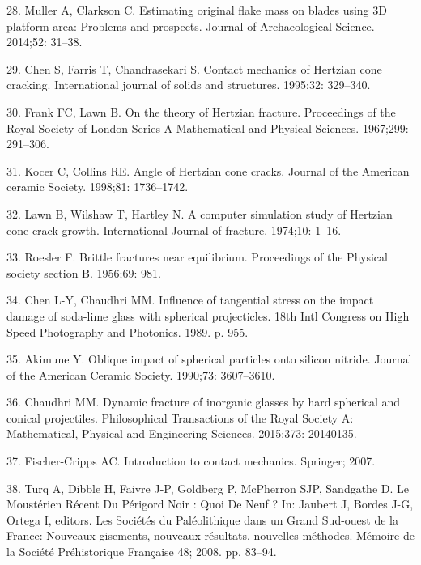 \documentclass[10pt,letterpaper]{article}
\begin{document}
\leavevmode\hypertarget{ref-muller_estimating_2014}{}%
28. Muller A, Clarkson C. Estimating original flake mass on blades using
3D platform area: Problems and prospects. Journal of Archaeological
Science. 2014;52: 31--38.

\leavevmode\hypertarget{ref-chen_contact_1995}{}%
29. Chen S, Farris T, Chandrasekari S. Contact mechanics of Hertzian
cone cracking. International journal of solids and structures. 1995;32:
329--340.

\leavevmode\hypertarget{ref-frank_theory_1967}{}%
30. Frank FC, Lawn B. On the theory of Hertzian fracture. Proceedings of
the Royal Society of London Series A Mathematical and Physical Sciences.
1967;299: 291--306.

\leavevmode\hypertarget{ref-kocer_angle_1998}{}%
31. Kocer C, Collins RE. Angle of Hertzian cone cracks. Journal of the
American ceramic Society. 1998;81: 1736--1742.

\leavevmode\hypertarget{ref-lawn_computer_1974}{}%
32. Lawn B, Wilshaw T, Hartley N. A computer simulation study of
Hertzian cone crack growth. International Journal of fracture. 1974;10:
1--16.

\leavevmode\hypertarget{ref-roesler_brittle_1956}{}%
33. Roesler F. Brittle fractures near equilibrium. Proceedings of the
Physical society section B. 1956;69: 981.

\leavevmode\hypertarget{ref-chen_influence_1989}{}%
34. Chen L-Y, Chaudhri MM. Influence of tangential stress on the impact
damage of soda-lime glass with spherical projecticles. 18th Intl
Congress on High Speed Photography and Photonics. 1989. p. 955.

\leavevmode\hypertarget{ref-akimune_oblique_1990}{}%
35. Akimune Y. Oblique impact of spherical particles onto silicon
nitride. Journal of the American Ceramic Society. 1990;73: 3607--3610.

\leavevmode\hypertarget{ref-chaudhri_dynamic_2015}{}%
36. Chaudhri MM. Dynamic fracture of inorganic glasses by hard spherical
and conical projectiles. Philosophical Transactions of the Royal Society
A: Mathematical, Physical and Engineering Sciences. 2015;373: 20140135.

\leavevmode\hypertarget{ref-fischer-cripps_introduction_2007}{}%
37. Fischer-Cripps AC. Introduction to contact mechanics. Springer;
2007.

\leavevmode\hypertarget{ref-jaubert_mousterien_2008}{}%
38. Turq A, Dibble H, Faivre J-P, Goldberg P, McPherron SJP, Sandgathe
D. Le Moustérien Récent Du Périgord Noir : Quoi De Neuf ? In: Jaubert J,
Bordes J-G, Ortega I, editors. Les Sociétés du Paléolithique dans un
Grand Sud-ouest de la France: Nouveaux gisements, nouveaux résultats,
nouvelles méthodes. Mémoire de la Société Préhistorique Française 48;
2008. pp. 83--94.
\end{document}
